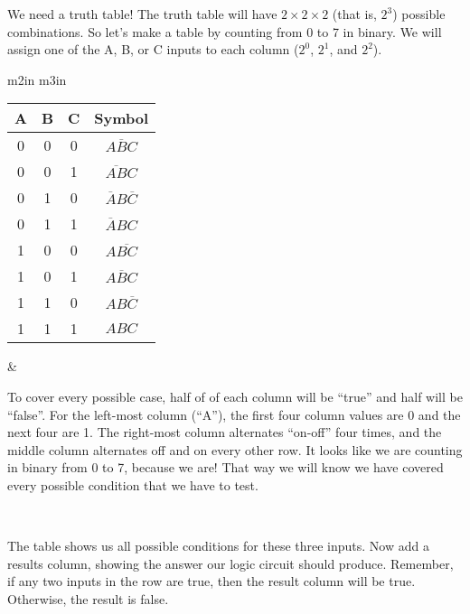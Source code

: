 We need a truth table!
The truth table will have $2 \times 2 \times 2$ (that is, $2^3$) possible combinations. 
So let's make a table by counting from 0 to 7 in binary.
We will assign one of the A, B, or C inputs to each column ($2^0$, $2^1$, and $2^2$).

\renewcommand{\arraystretch}{1.2}

\begin{tabular}{m{2in} m{3in}}

\begin{tabular}{cccc}
\hline
A & B & C & Symbol\\
\hline
0 & 0 & 0 & $\overline{ABC}$\\
0 & 0 & 1 & $\overline{AB}C$\\
0 & 1 & 0 & $\overline{A}B\overline{C}$\\
0 & 1 & 1 & $\overline{A}BC$\\
1 & 0 & 0 & $A\overline{BC}$\\
1 & 0 & 1 & $A\overline{B}C$\\
1 & 1 & 0 & $AB\overline{C}$\\
1 & 1 & 1 & $ABC$\\
\hline
\end{tabular}

&

To cover every possible case, half of of each column will be ``true'' and half will be ``false''.
For the left-most column (``A''), the first four column values are 0 and the next four are 1.
The right-most column alternates ``on-off'' four times, and the middle column alternates off and on every other row.
It looks like we are counting in binary from 0 to 7, because we are! That way we will know we have covered every possible condition that we have to test.

\\
\end{tabular}

\renewcommand{\arraystretch}{1.0}

The table shows us all possible conditions for these three inputs. Now add a results column, showing the answer our logic circuit should produce. Remember, if any two inputs in the row are true, then the result column will be true. Otherwise, the result is false.

